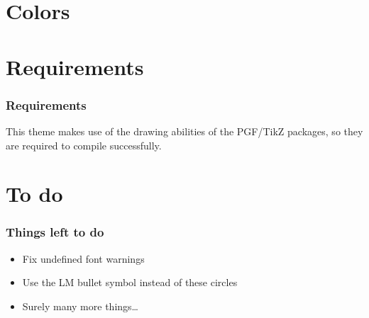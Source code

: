 \documentclass[xcolor=table]{beamer}
\begin{document}
\section{Colors}

\section{Requirements}
\begin{frame}
  \frametitle{Requirements}
  This theme makes use of the drawing abilities of the PGF/TikZ packages, so they are required to compile successfully.
\end{frame}

\section{To do}
\begin{frame}
  \frametitle{Things left to do}
  \begin{itemize}
	 \item Fix undefined font warnings
	 \item Use the LM bullet symbol instead of these circles
	 \item Surely many more things\ldots
  \end{itemize}
\end{frame}
\end{document}

